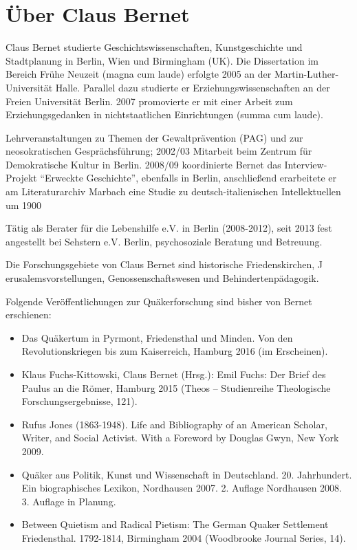 \pagebreak

\section{Über Claus Bernet}

Claus Bernet studierte Geschichtswissenschaften, Kunstgeschichte und 
Stadtplanung in Berlin, Wien und Birmingham (UK). Die Dissertation im Bereich 
Frühe Neuzeit (magna cum laude) erfolgte 2005 an der Martin-Luther-Universität 
Halle. Parallel dazu studierte er Erziehungswissenschaften an der Freien 
Universität Berlin. 2007 promovierte er mit einer Arbeit zum Erziehungsgedanken 
in nichtstaatlichen Einrichtungen (summa cum laude).

\medskip

Lehrveranstaltungen zu Themen der Gewaltprävention (PAG) und zur neosokratischen 
Gesprächsführung; 2002/03 Mitarbeit beim Zentrum für Demokratische Kultur in 
Berlin. 2008/09 koordinierte Bernet das Interview-Projekt 
"`Erweckte Geschichte"', ebenfalls in Berlin, anschließend erarbeitete er am 
Literaturarchiv Marbach eine Studie zu deutsch-italienischen Intellektuellen um 1900 

\medskip

Tätig als Berater für die Lebenshilfe e.V. in Berlin (2008-2012), seit 2013 
fest angestellt bei Sehstern e.V. Berlin, psychosoziale Beratung und Betreuung.

\medskip

Die Forschungsgebiete von Claus Bernet sind historische Friedenskirchen, J
erusalemsvorstellungen, Genossenschaftswesen und Behindertenpädagogik.

\medskip

Folgende Veröffentlichungen zur Quäkerforschung sind bisher von Bernet erschienen:

\begin{itemize}
 \item Das Quäkertum in Pyrmont, Friedensthal und Minden. Von den Revolutionskriegen bis zum Kaiserreich, Hamburg 2016 (im Erscheinen). 

 \item Klaus Fuchs-Kittowski, Claus Bernet (Hrsg.): Emil Fuchs: Der Brief des Paulus an die Römer, Hamburg 2015 (Theos – Studienreihe Theologische Forschungsergebnisse, 121).

 \item Rufus Jones (1863-1948). Life and Bibliography of an American Scholar, Writer, and
Social Activist. With a Foreword by Douglas Gwyn, New York 2009.

 \item Quäker aus Politik, Kunst und Wissenschaft in Deutschland. 20. Jahrhundert. Ein
biographisches Lexikon, Nordhausen 2007. 2. Auflage Nordhausen 2008. 3. Auflage
in Planung.

 \item Between Quietism and Radical Pietism: The German Quaker Settlement Friedensthal.
1792-1814, Birmingham 2004 (Woodbrooke Journal Series, 14).
\end{itemize}

